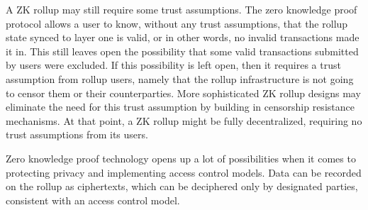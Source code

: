 \documentclass[11pt]{article}
\begin{document}
A ZK rollup may still require some trust assumptions. The zero knowledge proof
protocol allows a user to know, without any trust assumptions, that the rollup
state synced to layer one is valid, or in other words, no invalid transactions
made it in. This still leaves open the possibility that some valid transactions
submitted by users were excluded. If this possibility is left open, then it requires
a trust assumption from rollup users, namely that the rollup infrastructure is
not going to censor them or their counterparties. More sophisticated ZK rollup
designs may eliminate the need for this trust assumption by building in censorship
resistance mechanisms. At that point, a ZK rollup might be fully decentralized,
requiring no trust assumptions from its users.

Zero knowledge proof technology opens up a lot of possibilities when it comes
to protecting privacy and implementing access control models. Data can be recorded
on the rollup as ciphertexts, which can be deciphered only by designated parties,
consistent with an access control model. 
\end{document}
